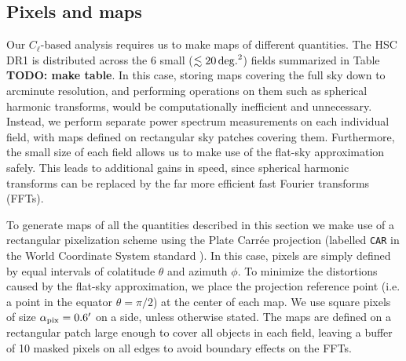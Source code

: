 \documentclass[a4paper,11pt]{article}
\newcommand{\todo}[1]{{\bf TODO: #1}}
\begin{document}
  \subsection{Pixels and maps}\label{ssec:methods.pix}
    Our $C_\ell$-based analysis requires us to make maps of different quantities. The HSC DR1 is distributed across the 6 small ($\lesssim20\,{\rm deg.}^2$) fields summarized in Table \todo{make table}. In this case, storing maps covering the full sky down to arcminute resolution, and performing operations on them such as spherical harmonic transforms, would be computationally inefficient and unnecessary. Instead, we perform separate power spectrum measurements on each individual field, with maps defined on rectangular sky patches covering them. Furthermore, the small size of each field allows us to make use of the flat-sky approximation safely. This leads to additional gains in speed, since spherical harmonic transforms can be replaced by the far more efficient fast Fourier transforms (FFTs).
    
    To generate maps of all the quantities described in this section we make use of a rectangular pixelization scheme using the Plate Carr\'ee projection (labelled {\tt CAR} in the World Coordinate System standard \cite{2002A&A...395.1077C}). In this case, pixels are simply defined by equal intervals of colatitude $\theta$ and azimuth $\phi$. To minimize the distortions caused by the flat-sky approximation, we place the projection reference point (i.e. a point in the equator $\theta=\pi/2$) at the center of each map. We use square pixels of size $\alpha_{\rm pix}=0.6'$ on a side, unless otherwise stated. The maps are defined on a rectangular patch large enough to cover all objects in each field, leaving a buffer of 10 masked pixels on all edges to avoid boundary effects on the FFTs.
  
\end{document}
